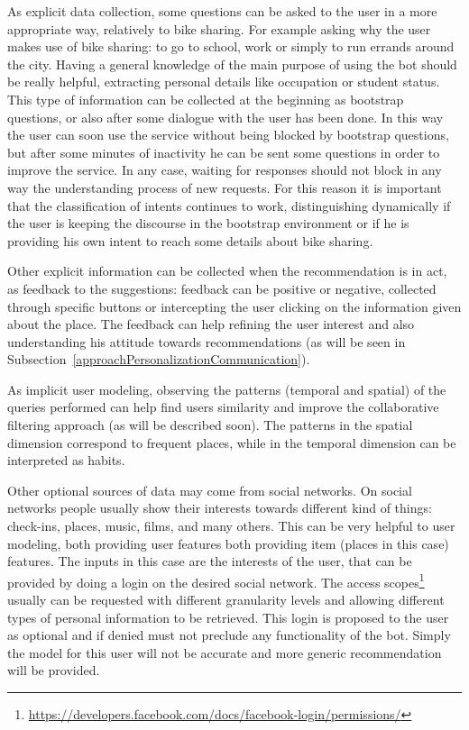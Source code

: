 As explicit data collection, some questions can be asked to the user in a more appropriate way, relatively to bike sharing. For example asking why the user makes use of bike sharing: to go to school, work or simply to run errands around the city. Having a general knowledge of the main purpose of using the bot should be really helpful, extracting personal details like occupation or student status. This type of information can be collected at the beginning as bootstrap questions, or also after some dialogue with the user has been done. In this way the user can soon use the service without being blocked by bootstrap questions, but after some minutes of inactivity he can be sent some questions in order to improve the service. In any case, waiting for responses should not block in any way the understanding process of new requests. For this reason it is important that the classification of intents continues to work, distinguishing dynamically if the user is keeping the discourse in the bootstrap environment or if he is providing his own intent to reach some details about bike sharing. 

Other explicit information can be collected when the recommendation is in act, as feedback to the suggestions: feedback can be positive or negative, collected through specific buttons or intercepting the user clicking on the information given about the place. The feedback can help refining the user interest and also understanding his attitude towards recommendations (as will be seen in Subsection~\ref{approachPersonalizationCommunication}).

As implicit user modeling, observing the patterns (temporal and spatial) of the queries performed can help find users similarity and improve the collaborative filtering approach (as will be described soon). The patterns in the spatial dimension correspond to frequent places, while in the temporal dimension can be interpreted as habits.

Other optional sources of data may come from social networks. On social networks people usually show their interests towards different kind of things: check-ins, places, music, films, and many others. This can be very helpful to user modeling, both providing user features both providing item (places in this case) features. The inputs in this case are the interests of the user, that can be provided by doing a login on the desired social network. The access scopes\footnote{\url{https://developers.facebook.com/docs/facebook-login/permissions/}} usually can be requested with different granularity levels and allowing different types of personal information to be retrieved. This login is proposed to the user as optional and if denied must not preclude any functionality of the bot. Simply the model for this user will not be accurate and more generic recommendation will be provided.

